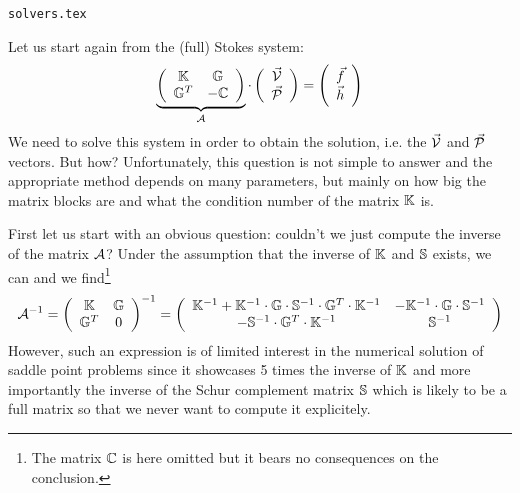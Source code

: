 \begin{flushright} {\tiny {\color{gray} \tt solvers.tex}} \end{flushright}

Let us start again from the (full) Stokes system:
\begin{equation}
\underbrace{
\left(
\begin{array}{cc}
{\mathbb{K}} & {\mathbb{G}} \\ {\mathbb{G}}^T & -{\mathbb{C}} 
\end{array}
\right)
}_{\cal A}
\cdot
\left(
\begin{array}{c}
\vec{\cal V} \\ \vec{\cal P}
\end{array}
\right)
=
\left(
\begin{array}{c}
\vec{f} \\ \vec{h}
\end{array}
\right)
\label{StokesSyst}
\end{equation}
We need to solve this system in order to obtain the solution, i.e. the $\vec{\cal V}$ 
and $\vec{\cal P}$ vectors. But how? 
Unfortunately, this question is not simple to answer and the appropriate method depends on many 
parameters, but mainly on how big the matrix blocks are and what the condition number of the matrix ${\mathbb{K}}$ is. 

First let us start with an obvious question: couldn't we just compute the inverse of the matrix ${\cal A}$?
Under the assumption that the inverse of ${\mathbb{K}}$ and ${\mathbb{S}}$ exists, we can and we find\footnote{The matrix 
${\mathbb{C}}$ is here omitted but it bears no consequences on the conclusion.}
\[
{\cal A}^{-1} = 
\left(
\begin{array}{cc}
{\mathbb{K}} & {\mathbb{G}} \\ {\mathbb{G}}^T & 0
\end{array}
\right)^{-1}
=
\left(
\begin{array}{cc}
{\mathbb{K}}^{-1} + {\mathbb{K}}^{-1} \cdot {\mathbb{G}} \cdot{\mathbb{S}}^{-1} \cdot{\mathbb{G}}^T \cdot{\mathbb{K}}^{-1} & -{\mathbb{K}}^{-1} \cdot{\mathbb{G}} \cdot{\mathbb{S}}^{-1} \\ 
-{\mathbb{S}}^{-1} \cdot{\mathbb{G}}^T \cdot{\mathbb{K}}^{-1}  &  {\mathbb{S}}^{-1}
\end{array}
\right)
\]
However, such an expression is of limited interest in the numerical solution of saddle
point problems since it showcases 5 times the inverse of ${\mathbb{K}}$ and more importantly
the inverse of the Schur complement matrix ${\mathbb{S}}$ which is likely to be a full matrix so 
that we never want to compute it explicitely.


